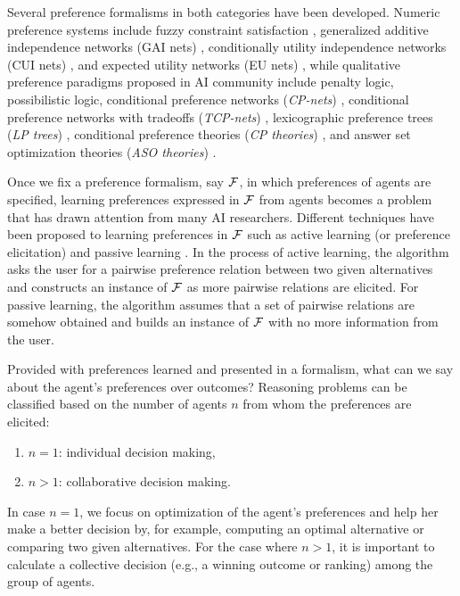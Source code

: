 Several preference formalisms in both categories have been developed.
Numeric preference systems include 
fuzzy constraint satisfaction \cite{343640} \cite{Bisterelli},
generalized additive independence networks (GAI nets) \cite{BacchusG95,LIP61766},
conditionally utility independence networks (CUI nets) \cite{EngelW06},
and expected utility networks (EU nets) \cite{Mura2013}, while 
qualitative preference paradigms proposed in AI community include
penalty logic, 
possibilistic logic, conditional preference networks (\emph{CP-nets}) \cite{Kaci:Pref},
conditional preference networks with tradeoffs (\emph{TCP-nets}) \cite{BrafmanD02:TCP},
lexicographic preference trees (\textit{LP trees}) \cite{booth:learningLP},
conditional preference theories (\textit{CP theories}) \cite{Wilson04extendingcp-nets},
and answer set optimization theories (\textit{ASO theories}) \cite{Brewka:ASO,Brewka04}.

Once we fix a preference formalism, say $\mathcal{F}$, in which preferences of agents
are specified, learning preferences expressed in $\mathcal{F}$ from agents
becomes a problem that has drawn attention from many AI researchers.
Different techniques have been proposed to learning preferences
in $\mathcal{F}$
such as active learning (or preference elicitation) and passive learning 
\cite{Furnkranz:pref_learning}.
In the process of
active learning, the algorithm asks the user for a pairwise 
preference relation between two given alternatives and constructs
an instance of $\mathcal{F}$ as more pairwise relations are elicited.
For passive learning, the algorithm assumes that a set of
pairwise relations are somehow obtained and builds an instance
of $\mathcal{F}$ with no more information from the user.

Provided with preferences learned and presented in a formalism,
what can we say about the agent's preferences over outcomes?
Reasoning problems can be classified
based on the number of agents $n$ from whom the preferences
are elicited:
\begin{enumerate} \itemsep -4pt
	\item $n=1$: individual decision making,
	\item $n>1$: collaborative decision making.
\end{enumerate}
In case $n=1$, we focus on optimization of the agent's preferences and
help her make a better decision by, for example, computing an optimal
alternative or comparing two given alternatives.  For the case
where $n>1$, it is important to calculate
a collective decision (e.g., a winning outcome or ranking)
among the group of agents.

